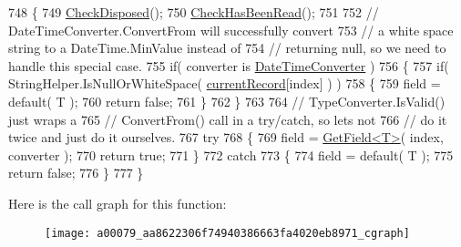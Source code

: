 \begin{DoxyCode}
748         \{
749             \hyperlink{a00079_a6fa45a46ed1322dc1872ca2321b5edbc}{CheckDisposed}();
750             \hyperlink{a00079_a2d9249171ed1568e45d152766d364c31}{CheckHasBeenRead}();
751 
752             \textcolor{comment}{// DateTimeConverter.ConvertFrom will successfully convert}
753             \textcolor{comment}{// a white space string to a DateTime.MinValue instead of}
754             \textcolor{comment}{// returning null, so we need to handle this special case.}
755             \textcolor{keywordflow}{if}( converter is \hyperlink{a00086}{DateTimeConverter} )
756             \{
757                 \textcolor{keywordflow}{if}( StringHelper.IsNullOrWhiteSpace( \hyperlink{a00079_ab2bfef15784add66e441c9d3a0d73751}{currentRecord}[index] ) )
758                 \{
759                     field = \textcolor{keywordflow}{default}( T );
760                     \textcolor{keywordflow}{return} \textcolor{keyword}{false};
761                 \}
762             \}
763 
764             \textcolor{comment}{// TypeConverter.IsValid() just wraps a}
765             \textcolor{comment}{// ConvertFrom() call in a try/catch, so lets not}
766             \textcolor{comment}{// do it twice and just do it ourselves.}
767             \textcolor{keywordflow}{try}
768             \{
769                 field = \hyperlink{a00079_a6a43cfaf39caea93ecd87e506be7b404}{GetField<T>}( index, converter );
770                 \textcolor{keywordflow}{return} \textcolor{keyword}{true};
771             \}
772             \textcolor{keywordflow}{catch}
773             \{
774                 field = \textcolor{keywordflow}{default}( T );
775                 \textcolor{keywordflow}{return} \textcolor{keyword}{false};
776             \}
777         \}
\end{DoxyCode}


Here is the call graph for this function\-:
\nopagebreak
\begin{figure}[H]
\begin{center}
\leavevmode
\texttt{[image: a00079\_aa8622306f74940386663fa4020eb8971\_cgraph]}
\end{center}
\end{figure}


